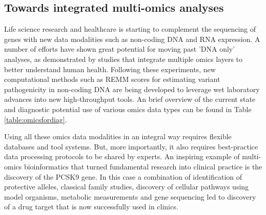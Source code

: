 \subsection{Towards integrated multi-omics analyses} \label{systemsection_multi}

Life science research and healthcare is starting to complement the sequencing of genes with new data modalities such as non-coding DNA and RNA expression.
A number of efforts have shown great potential for moving past 'DNA only' analyses, as demonstrated by studies that integrate multiple omics layers to better understand human health\cite{Price_2017}.
Following these experiments, new computational methods such as REMM scores\cite{Smedley_2016} for estimating variant pathogenicity in non-coding DNA are being developed to leverage wet laboratory advances into new high-throughput tools.
An brief overview of the current state and diagnostic potential use of various omics data types can be found in Table \ref{table:omicsfordiag}.

Using all these omics data modalities in an integral way requires flexible databases and tool systems.
But, more importantly, it also requires best-practice data processing protocols to be shared by experts.
An inspiring example of multi-omics bioinformatics that turned fundamental research into clinical practice is the discovery of the PCSK9 gene.
In this case a combination of identification of protective alleles, classical family studies, discovery of cellular pathways using model organisms, metabolic measurements and gene sequencing led to discovery of a drug target\cite{Abifadel_2014} that is now successfully used in clinics\cite{Everett_2015}.

